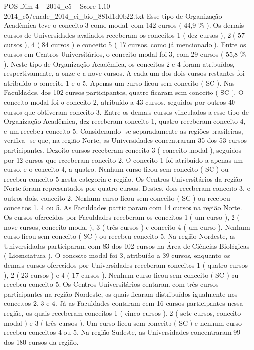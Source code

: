 \begin{textsample}{POS Dim 4 – 2014\_c5 – Score 1.00 – 2014\_c5/enade\_2014\_ci\_bio\_881d1d0b22.txt}
Esse tipo de Organização Acadêmica teve o conceito 3 como modal, com 142 cursos ( 44,9 \% ).
Os demais cursos de Universidades avaliados receberam os conceitos 1 ( dez cursos ), 2 ( 57 cursos ), 4 ( 84 cursos ) e conceito 5 ( 17 cursos, como já mencionado ).
Entre os cursos em Centros Universitários, o conceito modal foi 3, com 29 cursos ( 55,8 \% ).
Neste tipo de Organização Acadêmica, os conceitos 2 e 4 foram atribuídos, respectivamente, a onze e a nove cursos.
A cada um dos dois cursos restantes foi atribuído o conceito 1 e o 5.
Apenas um curso ficou sem conceito ( SC ).
Nas Faculdades, dos 102 cursos participantes, quatro ficaram sem conceito ( SC ).
O conceito modal foi o conceito 2, atribuído a 43 cursos, seguidos por outros 40 cursos que obtiveram conceito 3.
Entre os demais cursos vinculados a esse tipo de Organização Acadêmica, dez receberam conceito 1, quatro receberam conceito 4, e um recebeu conceito 5.
Considerando -se separadamente as regiões brasileiras, verifica -se que, na região Norte, as Universidades concentraram 35 dos 53 cursos participantes.
Dezoito cursos receberam conceito 3 ( conceito modal ), seguidos por 12 cursos que receberam conceito 2.
O conceito 1 foi atribuído a apenas um curso, e o conceito 4, a quatro.
Nenhum curso ficou sem conceito ( SC ) ou recebeu conceito 5 nesta categoria e região.
Os Centros Universitários da região Norte foram representados por quatro cursos.
Destes, dois receberam conceito 3, e outros dois, conceito 2.
Nenhum curso ficou sem conceito ( SC ) ou recebeu conceitos 1, 4 ou 5.
As Faculdades participaram com 14 cursos na região Norte.
Os cursos oferecidos por Faculdades receberam os conceitos 1 ( um curso ), 2 ( nove cursos, conceito modal ), 3 ( três cursos ) e conceito 4 ( um curso ).
Nenhum curso ficou sem conceito ( SC ) ou recebeu conceito 5.
Na região Nordeste, as Universidades participaram com 83 dos 102 cursos na Área de Ciências Biológicas ( Licenciatura ).
O conceito modal foi 3, atribuído a 39 cursos, enquanto os demais cursos oferecidos por Universidades receberam conceitos 1 ( quatro cursos ), 2 ( 23 cursos ) e 4 ( 17 cursos ).
Nenhum curso ficou sem conceito ( SC ) ou recebeu conceito 5.
Os Centros Universitários contaram com três cursos participantes na região Nordeste, os quais ficaram distribuídos igualmente nos conceitos 2, 3 e 4.
Já as Faculdades contaram com 16 cursos participantes nessa região, os quais receberam conceitos 1 ( cinco cursos ), 2 ( sete cursos, conceito modal ) e 3 ( três cursos ).
Um curso ficou sem conceito ( SC ) e nenhum curso recebeu conceitos 4 ou 5.
Na região Sudeste, as Universidades concentraram 99 dos 180 cursos da região.

\end{textsample}
